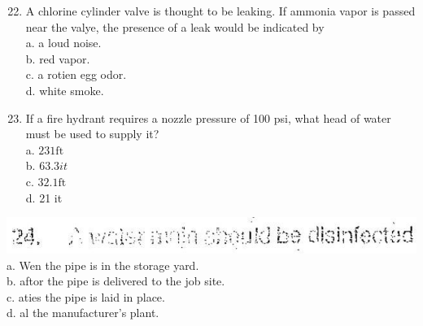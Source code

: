 \documentclass[10pt]{article}
\begin{document}
\begin{enumerate}
  \setcounter{enumi}{21}
  \item A chlorine cylinder valve is thought to be leaking. If ammonia vapor is passed near the valye, the presence of a leak would be indicated by\\
a. a loud noise.\\
b. red vapor.\\
c. a rotien egg odor.\\
d. white smoke.

  \item If a fire hydrant requires a nozzle pressure of 100 psi, what head of water must be used to supply it?\\
a. $231 \mathrm{ft}$\\
b. $63.3 \hat{i t}$\\
c. $32.1 \mathrm{ft}$\\
d. 21 it

\end{enumerate}

\includegraphics[max width=\textwidth]{2022_11_11_ca6a6c1a0324ee23e523g-20(2)}\\
a. Wen the pipe is in the storage yard.\\
b. aftor the pipe is delivered to the job site.\\
c. aties the pipe is laid in place.\\
d. al the manufacturer's plant.
%
\end{document}

